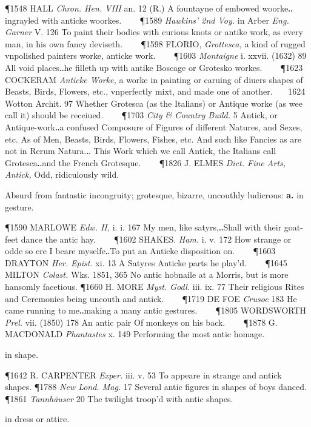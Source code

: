 \begin{description}[wide, labelwidth=!, labelindent=0pt]
\begin{myenumerate}
\P 1548 HALL \textit{Chron. Hen. VIII} an. 12 (R.) A fountayne of embowed
woorke‥ingrayled with anticke woorkes.    
\P 1589 \textit{Hawkins' 2nd Voy.} in Arber \textit{Eng. Garner} V. 126 To paint their 
bodies with curious knots or antike work, as every
man, in his own fancy deviseth.    
\P 1598 FLORIO, \textit{Grottesca,} a kind of rugged
vnpolished painters worke, anticke work.    
\P 1603 \textit{Montaigne} i. xxvii. (1632) 89
All void places‥he filleth up with antike Boscage or Grotesko workes.    
\P 1623 COCKERAM \textit{Anticke Worke,} a worke in painting or caruing of diuers shapes of
Beasts, Birds, Flowers, etc., vnperfectly mixt, and made one of another.    1624
Wotton Archit. 97 Whether Grotesca (as the Italians) or Antique worke (as wee
call it) should be receiued.    
\P 1703 \textit{City \& Country Build.} 5 Antick, or
Antique-work‥a confused Composure of Figures of different Natures, and Sexes,
etc. As of Men, Beasts, Birds, Flowers, Fishes, etc. And such like Fancies as
are not in Rerum Natura.‥ This Work which we call Antick, the Italians call
Grotesca‥and the French Grotesque.    
\P 1826 J. ELMES \textit{Dict. Fine Arts, Antick,} Odd, ridiculously wild.

 Absurd from fantastic incongruity; grotesque, bizarre, uncouthly
ludicrous: \textbf{a.} in gesture. 

\P 1590 MARLOWE \textit{Edw. II,} i. i. 167 My men, like satyrs,‥Shall with their
goat-feet dance the antic hay.    
\P 1602 SHAKES. \textit{Ham.} i. v. 172 How strange or
odde so ere I beare myselfe‥To put an Anticke disposition on.    
\P 1603 DRAYTON \textit{Her. Epist.} xi. 13 A Satyres Anticke parts he play'd.    
\P 1645 MILTON \textit{Colast.}
Wks. 1851, 365 No antic hobnaile at a Morris, but is more hansomly facetious.
\P 1660 H. MORE \textit{Myst. Godl.} iii. ix. 77 Their religious Rites and Ceremonies
being uncouth and antick.    
\P 1719 DE FOE \textit{Crusoe} 183 He came running to me‥making
a many antic gestures.    
\P 1805 WORDSWORTH \textit{Prel.} vii. (1850) 178 An antic pair Of
monkeys on his back.    
\P 1878 G. MACDONALD \textit{Phantastes} x. 149 Performing the most
antic homage.

 in shape. 

\P 1642 R. CARPENTER \textit{Exper.} iii. v. 53 To appeare in strange and antick shapes.
\P 1788 \textit{New Lond. Mag.} 17 Several antic figures in shapes of boys danced.
\P 1861 \textit{Tannhäuser} 20 The twilight troop'd with antic shapes.

 in dress or attire. 


\end{myenumerate}
\end{description}

